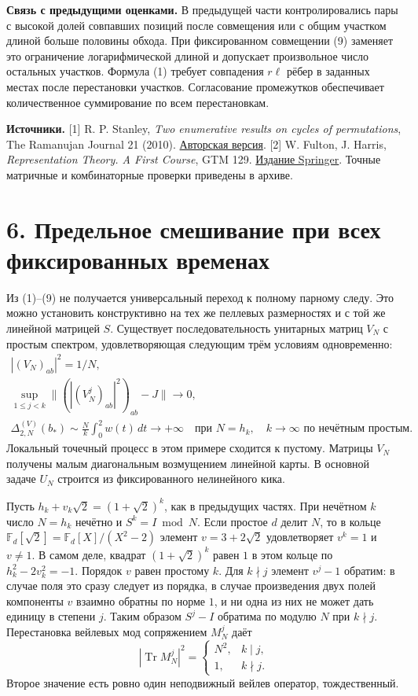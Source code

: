 \documentclass[11pt,a4paper]{article}
\newcommand{\Tr}{\operatorname{Tr}}
\newcommand{\sect}[1]{\section*{\sffamily\color{ink}#1}}
\begin{document}
\textbf{Связь с предыдущими оценками.} В предыдущей части контролировались пары с высокой долей совпавших позиций после совмещения или с общим участком длиной больше половины обхода. При фиксированном совмещении (9) заменяет это ограничение логарифмической длиной и допускает произвольное число остальных участков. Формула (1) требует совпадения $r\ell$ рёбер в заданных местах после перестановки участков. Согласование промежутков обеспечивает количественное суммирование по всем перестановкам.

\textbf{Источники.} [1] R. P. Stanley, \emph{Two enumerative results on cycles of permutations}, The Ramanujan Journal 21 (2010). \href{https://math.mit.edu/~rstan/papers/cycles.pdf}{Авторская версия}. [2] W. Fulton, J. Harris, \emph{Representation Theory. A First Course}, GTM 129. \href{https://doi.org/10.1007/978-1-4612-0979-9}{Издание Springer}. Точные матричные и комбинаторные проверки приведены в архиве.
\newpage
\sect{6. Предельное смешивание при всех фиксированных временах}
Из (1)--(9) не получается универсальный переход к полному парному следу. Это можно установить конструктивно на тех же пеллевых размерностях и с той же линейной матрицей $S$. Существует последовательность унитарных матриц $V_N$ с простым спектром, удовлетворяющая следующим трём условиям одновременно:
\[
 \begin{gathered}
       |(V_N)_{ab}|^2=1/N,\\
       \sup_{1\le j<k}\big\|(|(V_N^j)_{ab}|^2)_{ab}-J\big\|\longrightarrow0,\\
       \Delta_{2,N}^{(V)}(b_*)
          \sim \frac{N}{k}\int_0^2 w(t)\,dt\longrightarrow+\infty
                  \quad\text{при }N=h_k,\quad k\longrightarrow\infty
                    \text{ по нечётным простым}.                     \tag{10}
 \end{gathered}
\]
Локальный точечный процесс в этом примере сходится к пустому. Матрицы $V_N$ получены малым диагональным возмущением линейной карты. В основной задаче $U_N$ строится из фиксированного нелинейного кика.

Пусть $h_k+v_k\sqrt2=(1+\sqrt2)^k$, как в предыдущих частях. При нечётном $k$ число $N=h_k$ нечётно и $S^k=I\bmod N$. Если простое $d$ делит $N$, то в кольце $\mathbb F_d[\sqrt2]=\mathbb F_d[X]/(X^2-2)$ элемент $v=3+2\sqrt2$ удовлетворяет $v^k=1$ и $v\ne1$. В самом деле, квадрат $(1+\sqrt2)^k$ равен $1$ в этом кольце по $h_k^2-2v_k^2=-1$. Порядок $v$ равен простому $k$. Для $k\nmid j$ элемент $v^j-1$ обратим: в случае поля это сразу следует из порядка, в случае произведения двух полей компоненты $v$ взаимно обратны по норме $1$, и ни одна из них не может дать единицу в степени $j$. Таким образом $S^j-I$ обратима по модулю $N$ при $k\nmid j$. Перестановка вейлевых мод сопряжением $M_N^j$ даёт
\[
       |\Tr M_N^j|^2=
           \begin{cases}N^2,&k\mid j,\\1,&k\nmid j.\end{cases}        \tag{11}
\]
Второе значение есть ровно один неподвижный вейлев оператор, тождественный.
\end{document}
